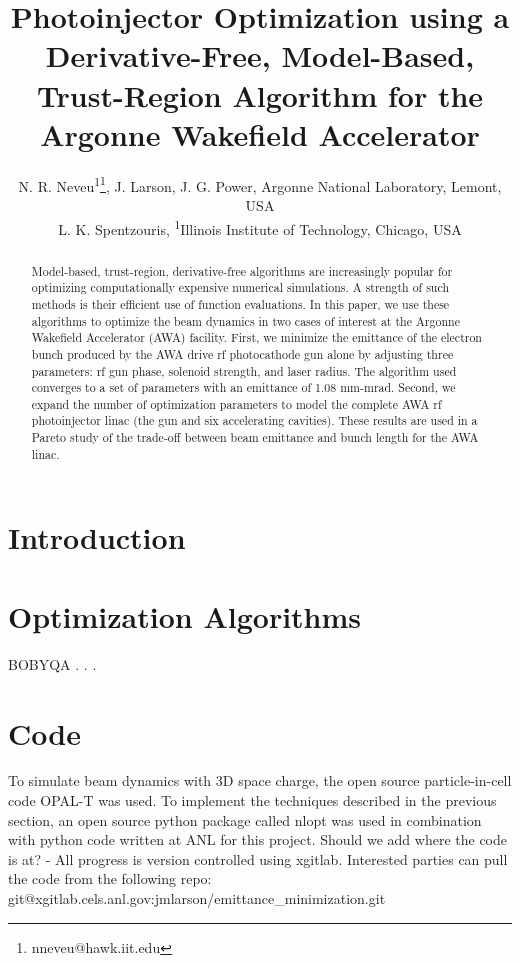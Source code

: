 \documentclass[letterpaper,  %
              ]{jacow}
\newcommand{\nnnote}[1]{\textsf{{\color{blue}{ NN note:}   #1 }}}
\begin{document}
\title{Photoinjector Optimization using a Derivative-Free, Model-Based, 
	Trust-Region Algorithm for the Argonne Wakefield Accelerator } 
	

\author{N. R. Neveu\textsuperscript{1}\thanks{nneveu@hawk.iit.edu}, J. Larson, J. G. Power, Argonne National Laboratory, Lemont, USA \\
		L. K. Spentzouris, \textsuperscript{1}Illinois Institute of Technology, Chicago, USA}
	
\maketitle

%
\begin{abstract}
Model-based, trust-region, derivative-free algorithms 
are increasingly popular for optimizing computationally 
expensive numerical simulations. A strength of such
methods is their efficient use of function evaluations. 
In this paper, we use these algorithms to optimize 
the beam dynamics in two cases of interest at the 
Argonne Wakefield Accelerator (AWA) facility. 
First, we minimize the emittance of the electron 
bunch produced by the AWA drive rf photocathode gun 
alone by adjusting three parameters: rf gun phase, 
solenoid strength, and laser radius. The algorithm 
used converges to a set of parameters with an
emittance of 1.08 mm-mrad. Second, we expand 
the number of optimization parameters to model 
the complete AWA rf photoinjector linac 
(the gun and six accelerating cavities). 
These results are used in a Pareto study of the 
trade-off between beam emittance and bunch 
length for the AWA linac.
\end{abstract}


\section{Introduction}


\section{Optimization Algorithms}
BOBYQA \cite{bobyqa}. . .


\section{Code}
To simulate beam dynamics with 3D space charge, 
the open source particle-in-cell code OPAL-T 
\cite{opal} was used. To implement the techniques 
described in the previous section, an open source 
python package called nlopt \cite{nlopt} was used
in combination with python code written at ANL for this project.
\nnnote{Should we add where the code is at? -  
	All progress is version controlled using xgitlab.
Interested parties can pull the code from the following repo: 
git@xgitlab.cels.anl.gov:jmlarson/emittance\_minimization.git}
\end{document}
